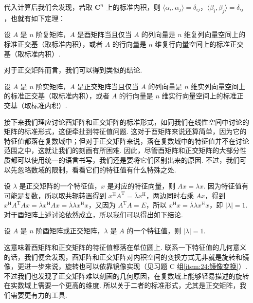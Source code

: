 代入计算后我们会发现，若取 $ \mathbf{C}^n $ 上的标准内积，则 $ \langle \alpha_i, \alpha_j \rangle = \delta_{ij} $，$ \langle \beta_i, \beta_j \rangle = \delta_{ij} $，也就有如下定理：

\begin{theorem}{}{}
    设 $ A $ 是 $ n $ 阶复矩阵，$ A $ 是酉矩阵当且仅当 $ A $ 的列向量是 $ n $ 维复列向量空间上的标准正交基（取标准内积），或者 $ A $ 的行向量是 $ n $ 维复行向量空间上的标准正交基（取标准内积）.
\end{theorem}

对于正交矩阵而言，我们可以得到类似的结论.

\begin{theorem}{}{}
    设 $ A $ 是 $ n $ 阶实矩阵，$ A $ 是正交矩阵当且仅当 $ A $ 的列向量是 $ n $ 维实列向量空间上的标准正交基（取标准内积），或者 $ A $ 的行向量是 $ n $ 维实行向量空间上的标准正交基（取标准内积）.
\end{theorem}

接下来我们理应讨论酉矩阵和正交矩阵的标准形式，如同我们在线性空间中讨论的矩阵的标准形式，这便牵扯到特征值问题. 这对于酉矩阵来说还算简单，因为它的特征值都落在复数域中；但对于正交矩阵来说，落在复数域中的特征值并不在讨论范围之中，这就让我们的刻画有所困难. 因此，尽管酉矩阵和正交矩阵的大部分性质都可以使用统一的语言书写，我们还是要将它们区别出来的原因. 不过，我们可以先忽略数域的限制，看看它们的特征值有什么特殊之处.

设 $ \lambda $ 是正交矩阵的一个特征值，$ x $ 是对应的特征向量，则 $ Ax = \lambda x $. 因为特征值有可能是复数，所以取共轭转置得到 $ x^{\mathrm{H}}A^{\mathrm{T}} = \bar{\lambda} x^{\mathrm{H}} $，两边同时右乘 $ Ax $，得到 $ x^{\mathrm{H}}A^{\mathrm{T}}Ax = \bar{\lambda} x^{\mathrm{H}}Ax = \bar{\lambda} \lambda x^{\mathrm{H}}x $，又因为 $ A^{\mathrm{T}}A = E $，所以 $ x^{\mathrm{H}}x = \bar{\lambda} \lambda x^{\mathrm{H}}x $，即 $ \lvert \lambda \rvert = 1 $. 对于酉矩阵上述讨论依然成立，所以我们可以得出如下结论.

\begin{theorem}{}{}
    设 $ A $ 是 $ n $ 阶酉矩阵或正交矩阵，$ \lambda $ 是 $ A $ 的一个特征值，则 $ \lvert \lambda \rvert = 1 $.
\end{theorem}

这意味着酉矩阵和正交矩阵的特征值都落在单位圆上. 联系一下特征值的几何意义的话，我们便会发现，酉矩阵和正交矩阵对内积空间的变换方式无非就是旋转和镜像，更进一步来说，旋转也可以依靠镜像实现（见习题 C 组\ref*{item:24:镜像变换}）. 不过我们也发现了正交矩阵难以刻画的几何原因，在复数域上能够轻易描述的旋转在实数域上需要一个更高的维度. 所以关于二者的标准形式，尤其是正交矩阵，我们需要更有力的工具.

